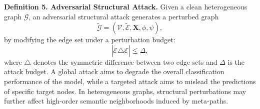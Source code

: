 \noindent\textbf{Definition 5. Adversarial Structural Attack.}
Given a clean heterogeneous graph $\mathcal{G}$, an adversarial structural attack generates a perturbed graph
\begin{equation}
\widetilde{\mathcal{G}}
=
(\mathcal{V},\widetilde{\mathcal{E}},\mathbf{X},\phi,\psi),
\end{equation}
by modifying the edge set under a perturbation budget:
\begin{equation}
|\widetilde{\mathcal{E}}\triangle\mathcal{E}| \leq \Delta,
\end{equation}
where $\triangle$ denotes the symmetric difference between two edge sets and $\Delta$ is the attack budget.
A global attack aims to degrade the overall classification performance of the model, while a targeted attack aims to mislead the predictions of specific target nodes.
In heterogeneous graphs, structural perturbations may further affect high-order semantic neighborhoods induced by meta-paths.




